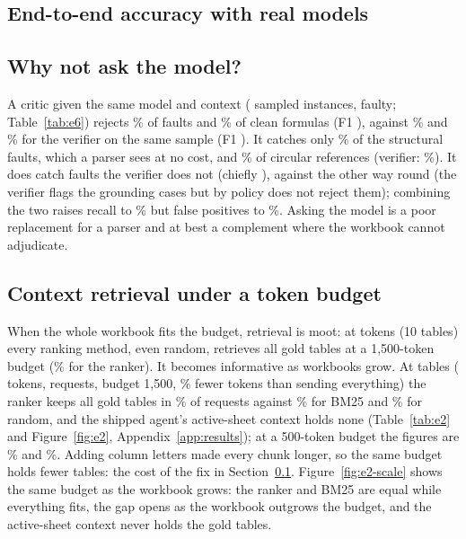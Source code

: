 \subsection{End-to-end accuracy with real models}
\label{sec:e5}


\ifdefined\sixN
\subsection{Why not ask the model?}
\label{sec:e6}

A critic given the same model and context (\sixN{} sampled instances, \sixFaults{} faulty; Table~\ref{tab:e6}) rejects \sixCriticR\% of faults and \sixCriticFPR\% of clean formulas (F1 \sixCriticF), against \sixVerR\% and \sixVerFPR\% for the verifier on the same sample (F1 \sixVerF). It catches only \sixCriticStructural\% of the structural faults, which a parser sees at no cost, and \sixCriticCircular\% of circular references (verifier: \sixVerCircular\%). It does catch \sixCriticOnlyCaught{} faults the verifier does not (chiefly \sixCriticOnlyWhere), against \sixVerOnlyCaught{} the other way round (the verifier flags the grounding cases but by policy does not reject them); combining the two raises recall to \sixEitherR\% but false positives to \sixEitherFPR\%. Asking the model is a poor replacement for a parser and at best a complement where the workbook cannot adjudicate.
\fi

\subsection{Context retrieval under a token budget}
\label{sec:e2}
When the whole workbook fits the budget, retrieval is moot: at \eTwoZeroFull{} tokens (10 tables) every ranking method, even random, retrieves all gold tables at a 1{,}500-token budget (\eTwoZeroComplete\% for the ranker). It becomes informative as workbooks grow. At \eTwoTables{} tables (\eTwoFull{} tokens, \eTwoReq{} requests, budget 1{,}500, \eTwoReduction\% fewer tokens than sending everything) the ranker keeps all gold tables in \eTwoRankerComplete\% of requests against \eTwoBmComplete\% for BM25 and \eTwoRandComplete\% for random, and the shipped agent's active-sheet context holds none (Table~\ref{tab:e2} and Figure~\ref{fig:e2}, Appendix~\ref{app:results}); at a 500-token budget the figures are \eTwoRankerCompleteSmall\% and \eTwoBmCompleteSmall\%. Adding column letters made every chunk longer, so the same budget holds fewer tables: the cost of the fix in Section~\ref{sec:e5}. Figure~\ref{fig:e2-scale} shows the same budget as the workbook grows: the ranker and BM25 are equal while everything fits, the gap opens as the workbook outgrows the budget, and the active-sheet context never holds the gold tables.

